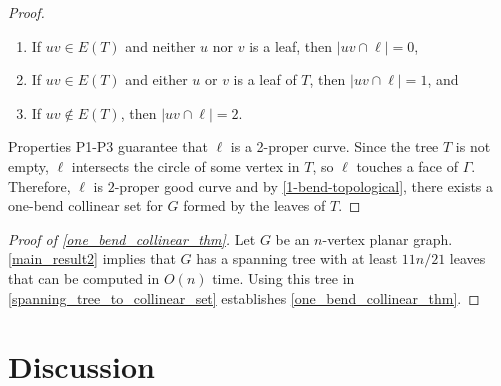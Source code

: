 \documentclass[11pt]{article}
\newcommand{\pat}[1]{\textcolor{red}{PM: #1}}
\newtheorem{thm}{Theorem}
\theoremstyle{definition}
\begin{document}
\begin{proof}
    \begin{enumerate}
        \item [(P1)] If $uv \in E(T)$ and neither $u$ nor $v$ is a leaf, then $|uv \cap \ell| = 0$,

        \item [(P2)] If $uv \in E(T)$ and either $u$ or $v$ is a leaf of $T$, then $|uv \cap \ell| = 1$, and

        \item [(P3)] If $uv \notin E(T)$, then $|uv \cap \ell| = 2$.
    \end{enumerate}

    Properties P1-P3 guarantee that $\ell$ is a 2-proper curve. Since the tree $T$ is not empty, $\ell$ intersects the circle of some vertex in $T$, so $\ell$ touches a face of $\Gamma$. Therefore, $\ell$ is $2$-proper good curve and by \cref{1-bend-topological}, there exists a one-bend collinear set for $G$ formed by the leaves of $T$.
\end{proof}

\begin{proof}[Proof of \cref{one_bend_collinear_thm}]
Let $G$ be an $n$-vertex planar graph. \cref{main_result2} implies that $G$ has a spanning tree with at least $11n/21$ leaves that can be computed in $O(n)$ time. Using this tree in \cref{spanning_tree_to_collinear_set} establishes \cref{one_bend_collinear_thm}.
\end{proof}

\section{Discussion}
\label{discussion}



\end{document}
